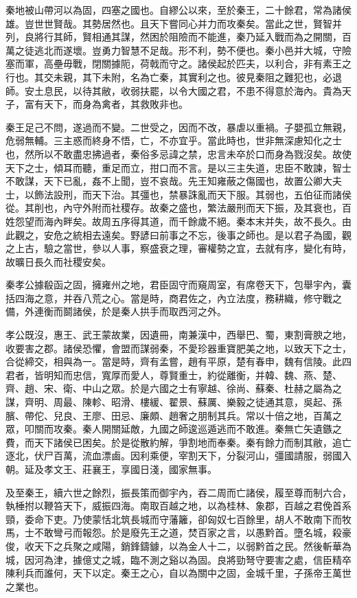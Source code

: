 秦地被山帶河以為固，四塞之國也。自繆公以來，至於秦王，二十餘君，常為諸侯雄。豈世世賢哉。其勢居然也。且天下嘗同心并力而攻秦矣。當此之世，賢智并列，良將行其師，賢相通其謀，然困於阻險而不能進，秦乃延入戰而為之開關，百萬之徒逃北而遂壞。豈勇力智慧不足哉。形不利，勢不便也。秦小邑并大城，守險塞而軍，高壘毋戰，閉關據阨，荷戟而守之。諸侯起於匹夫，以利合，非有素王之行也。其交未親，其下未附，名為亡秦，其實利之也。彼見秦阻之難犯也，必退師。安土息民，以待其敝，收弱扶罷，以令大國之君，不患不得意於海內。貴為天子，富有天下，而身為禽者，其救敗非也。

秦王足己不問，遂過而不變。二世受之，因而不改，暴虐以重禍。子嬰孤立無親，危弱無輔。三主惑而終身不悟，亡，不亦宜乎。當此時也，世非無深慮知化之士也，然所以不敢盡忠拂過者，秦俗多忌諱之禁，忠言未卒於口而身為戮沒矣。故使天下之士，傾耳而聽，重足而立，拑口而不言。是以三主失道，忠臣不敢諫，智士不敢謀，天下已亂，姦不上聞，豈不哀哉。先王知雍蔽之傷國也，故置公卿大夫士，以飾法設刑，而天下治。其彊也，禁暴誅亂而天下服。其弱也，五伯征而諸侯從。其削也，內守外附而社稷存。故秦之盛也，繁法嚴刑而天下振，及其衰也，百姓怨望而海內畔矣。故周五序得其道，而千餘歲不絕。秦本末并失，故不長久。由此觀之，安危之統相去遠矣。野諺曰前事之不忘，後事之師也。是以君子為國，觀之上古，驗之當世，參以人事，察盛衰之理，審權勢之宜，去就有序，變化有時，故曠日長久而社稷安矣。

秦孝公據殽函之固，擁雍州之地，君臣固守而窺周室，有席卷天下，包舉宇內，囊括四海之意，并吞八荒之心。當是時，商君佐之，內立法度，務耕織，修守戰之備，外連衡而鬬諸侯，於是秦人拱手而取西河之外。

孝公既沒，惠王、武王蒙故業，因遺冊，南兼漢中，西舉巴、蜀，東割膏腴之地，收要害之郡。諸侯恐懼，會盟而謀弱秦，不愛珍器重寶肥美之地，以致天下之士，合從締交，相與為一。當是時，齊有孟嘗，趙有平原，楚有春申，魏有信陵。此四君者，皆明知而忠信，寬厚而愛人，尊賢重士，約從離衡，并韓、魏、燕、楚、齊、趙、宋、衛、中山之眾。於是六國之士有寧越、徐尚、蘇秦、杜赫之屬為之謀，齊明、周最、陳軫、昭滑、樓緩、翟景、蘇厲、樂毅之徒通其意，吳起、孫臏、帶佗、兒良、王廖、田忌、廉頗、趙奢之朋制其兵。常以十倍之地，百萬之眾，叩關而攻秦。秦人開關延敵，九國之師逡巡遁逃而不敢進。秦無亡矢遺鏃之費，而天下諸侯已困矣。於是從散約解，爭割地而奉秦。秦有餘力而制其敝，追亡逐北，伏尸百萬，流血漂鹵。因利乘便，宰割天下，分裂河山，彊國請服，弱國入朝。延及孝文王、莊襄王，享國日淺，國家無事。

及至秦王，續六世之餘烈，振長策而御宇內，吞二周而亡諸侯，履至尊而制六合，執棰拊以鞭笞天下，威振四海。南取百越之地，以為桂林、象郡，百越之君俛首系頸，委命下吏。乃使蒙恬北筑長城而守藩籬，卻匈奴七百餘里，胡人不敢南下而牧馬，士不敢彎弓而報怨。於是廢先王之道，焚百家之言，以愚黔首。墮名城，殺豪俊，收天下之兵聚之咸陽，銷鋒鑄鐻，以為金人十二，以弱黔首之民。然後斬華為城，因河為津，據億丈之城，臨不測之谿以為固。良將勁弩守要害之處，信臣精卒陳利兵而誰何，天下以定。秦王之心，自以為關中之固，金城千里，子孫帝王萬世之業也。

